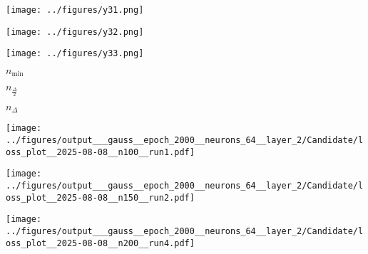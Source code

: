 \begin{otherlanguage}{ngerman}
\begin{samepage}
\begin{minipage}{\textwidth}
\vspace{0.125cm}

\begin{minipage}{0.05\textwidth}\centering{}\end{minipage}%
\begin{minipage}{0.3\textwidth}\centering\texttt{[image: ../figures/y31.png]}\end{minipage}%
\begin{minipage}{0.3\textwidth}\centering\texttt{[image: ../figures/y32.png]}\end{minipage}%
\begin{minipage}{0.3\textwidth}\centering\texttt{[image: ../figures/y33.png]}\end{minipage}

\label{fig:matrix_plot_gauss}

\begin{minipage}{0.05\textwidth}\vspace{0.5cm}\end{minipage}%
\begin{minipage}{0.3\textwidth}\centering \textbf{$n_{\mathrm{min}}$}\end{minipage}%
\begin{minipage}{0.3\textwidth}\centering \textbf{$n_{\frac{\Delta}{2}}$}\end{minipage}%
\begin{minipage}{0.3\textwidth}\centering \textbf{$n_{\Delta}$}\end{minipage}

\vspace{0.125cm}

\begin{minipage}{0.05\textwidth}\centering{}\end{minipage}%
\begin{minipage}{0.3\textwidth}
    \centering
    \texttt{[image: ../figures/output\_\_\_gauss\_\_epoch\_2000\_\_neurons\_64\_\_layer\_2/Candidate/loss\_plot\_\_2025-08-08\_\_n100\_\_run1.pdf]}
\end{minipage}%
\begin{minipage}{0.3\textwidth}
    \centering
    \texttt{[image: ../figures/output\_\_\_gauss\_\_epoch\_2000\_\_neurons\_64\_\_layer\_2/Candidate/loss\_plot\_\_2025-08-08\_\_n150\_\_run2.pdf]}
\end{minipage}%
\begin{minipage}{0.3\textwidth}
    \centering
    \texttt{[image: ../figures/output\_\_\_gauss\_\_epoch\_2000\_\_neurons\_64\_\_layer\_2/Candidate/loss\_plot\_\_2025-08-08\_\_n200\_\_run4.pdf]}
\end{minipage}


\end{minipage}
\end{samepage}
\end{otherlanguage}
